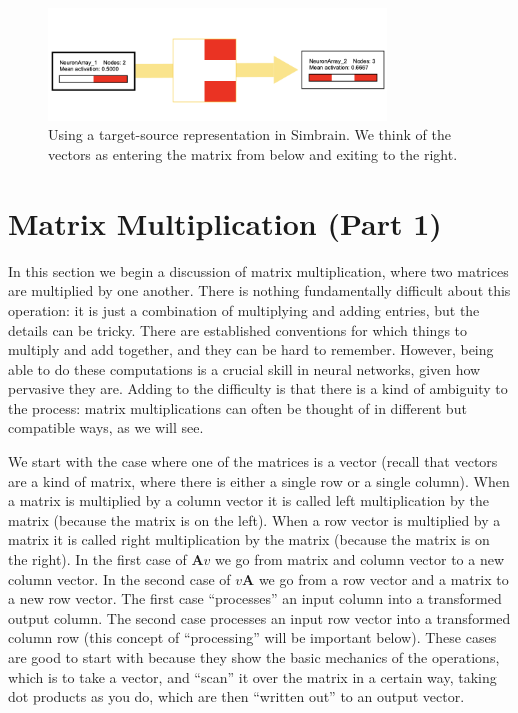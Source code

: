 \begin{figure}[h]
\centering
\includegraphics[width=0.8\textwidth]{images/targetSourceSimbrain.png}
\caption[Jeff Yoshimi.]{Using a target-source representation in Simbrain. We think of the vectors as entering the matrix from below and exiting to the right.}
\label{targetSourceSimbrain}
\end{figure}

\section{Matrix Multiplication (Part 1)}

In this section we begin a discussion of matrix multiplication, where two matrices are multiplied by one another. There is nothing fundamentally difficult about this operation: it is just a combination of multiplying and adding entries, but the details can be tricky. There are established conventions for which things to multiply and add together, and they can be hard to remember. However, being able to do these computations is a crucial skill in neural networks, given how pervasive they are. Adding to the difficulty is that there is a kind of ambiguity to the process: matrix multiplications can often be thought of in different but compatible ways, as we will see.

We start with the case where one of the matrices is a vector (recall that vectors are a kind of matrix, where there is either a single row or a single column). When a matrix is multiplied by a column vector it is called left multiplication by the matrix (because the matrix is on the left). When a row vector is multiplied by a matrix it is called right multiplication by the matrix (because the matrix is on the right). In the first case of $\mathbf{A}v$ we go from matrix and column vector to a new column vector. In the second case of $v\mathbf{A}$ we go from a row vector and a matrix to a new row vector.  The first case ``processes'' an input column into a transformed output column. The second case processes an input row vector into a transformed column row (this concept of ``processing'' will be important below). These cases are good to start with because they show the basic mechanics of the operations, which is to take a vector, and ``scan'' it over the matrix in a certain way, taking dot products as you do, which are then ``written out'' to an output vector.  

